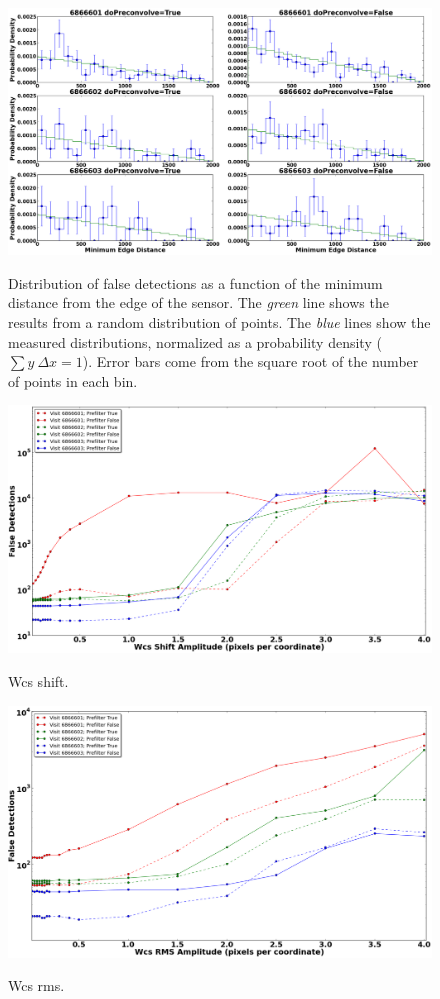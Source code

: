 \documentclass[prd, nofootinbib, floatfix, 11pt,tightenlines,times]{article}
\begin{document}
\begin{figure}
\includegraphics[width=1.0\textwidth]{figures/edge.eps} \\
\caption{Distribution of false detections as a function of the minimum
  distance from the edge of the sensor.  The {\it green} line shows
  the results from a random distribution of points.  The {\it blue}
  lines show the measured distributions, normalized as a probability
  density ($\sum y~\Delta x = 1$).  Error bars come from the square
  root of the number of points in each bin. }
\label{edgedist}
\end{figure}

\begin{figure}
\includegraphics[width=1.0\textwidth]{figures/wcs_shift.eps} \\
\caption{Wcs shift.}
\label{wcsshift}
\end{figure}

\begin{figure}
\includegraphics[width=1.0\textwidth]{figures/wcs_rms.eps} \\
\caption{Wcs rms.}
\label{wcsrms}
\end{figure}
\end{document}
